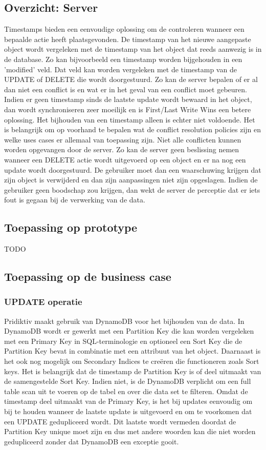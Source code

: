 \subsection{Overzicht: Server}
Timestamps bieden een eenvoudige oplossing om de controleren wanneer een bepaalde actie heeft plaatsgevonden. De timestamp van het nieuwe aangepaste object wordt vergeleken met de timestamp van het object dat reeds aanwezig is in de database. Zo kan bijvoorbeeld een timestamp worden bijgehouden in een 'modified' veld. Dat veld kan worden vergeleken met de timestamp van de UPDATE of DELETE die wordt doorgestuurd. Zo kan de server bepalen of er al dan niet een conflict is en wat er in het geval van een conflict moet gebeuren. Indien er geen timestamp sinds de laatste update wordt bewaard in het object, dan wordt synchroniseren zeer moeilijk en is First/Last Write Wins een betere oplossing. Het bijhouden van een timestamp alleen is echter niet voldoende. Het is belangrijk om op voorhand te bepalen wat de conflict resolution policies zijn en welke uses cases er allemaal van toepassing zijn. Niet alle conflicten kunnen worden opgevangen door de server. Zo kan de server geen beslissing nemen wanneer een DELETE actie wordt uitgevoerd op een object en er na nog een update wordt doorgestuurd. De gebruiker moet dan een waarschuwing krijgen dat zijn object is verwijderd en dan zijn aanpassingen niet zijn opgeslagen. Indien de gebruiker geen boodschap zou krijgen, dan wekt de server de perceptie dat er iets fout is gegaan bij de verwerking van de data.
\subsection{Toepassing op prototype}
TODO
\subsection{Toepassing op de business case}
\subsubsection{UPDATE operatie}
Pridiktiv maakt gebruik van DynamoDB voor het bijhouden van de data. In DynamoDB wordt er gewerkt met een Partition Key die kan worden vergeleken met een Primary Key in SQL-terminologie en optioneel een Sort Key die  de Partition Key bevat in combinatie met een attribuut van het object. Daarnaast is het ook nog mogelijk om Secondary Indices te cre\"eren die functioneren zoals Sort keys.  Het is belangrijk dat de timestamp de Partition Key is of deel uitmaakt van de samengestelde Sort Key. Indien niet, is de DynamoDB verplicht om een full table scan uit te voeren op de tabel en over die data set te filteren. Omdat de timestamp deel uitmaakt van de Primary Key, is het bij updates eenvoudig om bij te houden wanneer de laatste update is uitgevoerd en om te voorkomen dat een UPDATE gedupliceerd wordt. Dit laatste wordt vermeden doordat de Partition Key unique moet zijn en dus met andere woorden kan die niet worden gedupliceerd zonder dat DynamoDB een exceptie gooit.
